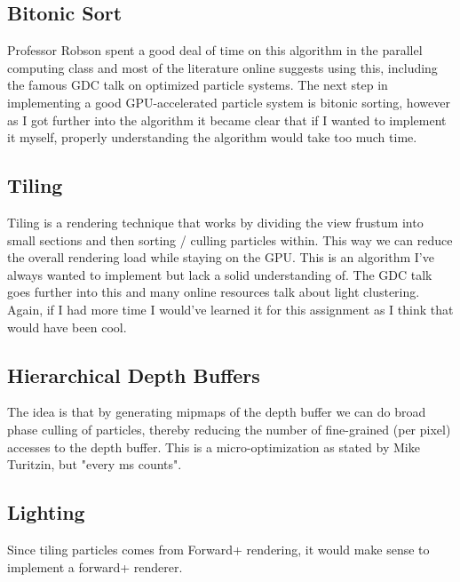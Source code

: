 \documentclass[]{report}
\begin{document}
\subsection{Bitonic Sort}
Professor Robson spent a good deal of time on this algorithm in the parallel computing class and most of the literature online suggests using this, including the famous GDC talk on optimized particle systems\cite{gpuparticles}. The next step in implementing a good GPU-accelerated particle system is bitonic sorting, however as I got further into the algorithm it became clear that if I wanted to implement it myself, properly understanding the algorithm would take too much time. 
\subsection{Tiling}
Tiling is a rendering technique that works by dividing the view frustum into small sections and then sorting / culling particles within. This way we can reduce the overall rendering load while staying on the GPU. This is an algorithm I've always wanted to implement but lack a solid understanding of. The GDC talk goes further into this and many online resources talk about light clustering\cite{gpuparticles}. Again, if I had more time I would've learned it for this assignment as I think that would have been cool. 
\subsection{Hierarchical Depth Buffers}
The idea is that by generating mipmaps of the depth buffer we can do broad phase culling of particles, thereby reducing the number of fine-grained (per pixel) accesses to the depth buffer. This is a micro-optimization as stated by Mike Turitzin, but "every ms counts"\cite{depth}. 
\subsection{Lighting}
Since tiling particles comes from Forward+ rendering, it would make sense to implement a forward+ renderer. 
\end{document}
